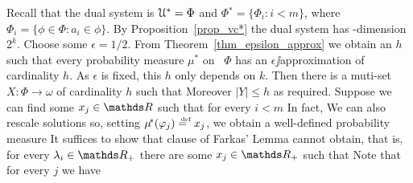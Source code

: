 \documentclass[sputnik.tex]{subfiles}
\begin{document}
Recall that the dual system is $\EuScript U^*=\Phi$ and $\Phi\!^{*}\!=\big\{\Phi_i: i<m\big\}$, where $\Phi_i=\big\{\phi\in\Phi: a_i\in\phi\big\}$.
By Proposition~\ref{prop_vc*} the dual system has \vc-dimension $2^k$.
Choose some $\epsilon=1/2$.
From Theorem~\ref{thm_epsilon_approx} we obtain an $h$ such that every probability measure $\mu^*\!$ on \ $\Phi$ has an $\epsilon\jj$ap\-prox\-i\-ma\-tion of cardinality $h$.
As $\epsilon$ is fixed, this $h$ only depends on $k$.
Then there is a muti-set $X:\Phi\to\omega$ of cardinality $h$ such that
% 
% 
% 
% 
Moreover $|Y|\le h$ as required.
% 
Suppose we can find some $x_j\in\RR$ such that for every $i<m$
% 
% 
In fact,
% 
% 
We can also rescale solutions so, setting $\mu\!^*(\phi_j)\deq x_j$, we obtain a well-defined probability measure
% 
% 
It suffices to show that clause  of Farkas' Lemma cannot obtain, that is, for every $\lambda_i\in\RR_+$ there are some $x_j\in\RR_+$ such that
% 
% 
Note that for every $j$ we have
% 
% 
\end{document}

